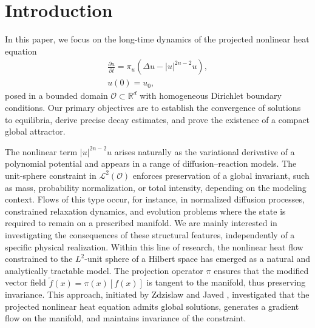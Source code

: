 \documentclass[reqno]{amsart}
\begin{document}
\section{Introduction}\label{sec-Introduction}

In this paper, we focus on the long-time dynamics of the projected nonlinear heat
equation
\begin{equation}\label{1.6}
\begin{gathered}
\frac{\partial u}{\partial t} = \pi_{u} \left( \Delta u - |u|^{2n-2} u \right), \\
u(0) = u_{0},
\end{gathered}
\end{equation}
posed in a bounded domain $\mathcal{O}\subset\mathbb{R}^{d}$ with homogeneous Dirichlet
boundary conditions. Our primary objectives are to establish the convergence of
solutions to equilibria, derive precise decay estimates, and prove the existence of
a compact global attractor.

The nonlinear term $|u|^{2n-2}u$ arises naturally as the variational derivative of
a polynomial potential and appears in a range of diffusion–reaction models.
The unit-sphere constraint in $\mathcal L^{2}(\mathcal O)$ enforces preservation of
a global invariant, such as mass, probability normalization, or total intensity,
depending on the modeling context.
Flows of this type occur, for instance, in normalized diffusion processes, constrained
relaxation dynamics, and evolution problems where the state is required to remain on
a prescribed manifold.
We are mainly interested in investigating the consequences of these structural
features, independently of a specific physical realization.
Within this line of research, the nonlinear heat flow constrained to the $L^2$-unit
sphere of a Hilbert space has emerged as a natural and analytically tractable model.
The projection operator $\pi$ ensures that the modified vector field
$\widetilde{f}(x)=\pi(x)[f(x)]$ is tangent to the manifold, thus preserving invariance.
This approach, initiated by Zdzislaw and Javed
\cite{Brz+Huss_2024,Hussain_2005,Huss_2023},
investigated that the projected nonlinear heat equation admits global solutions,
generates a gradient flow on the manifold, and maintains invariance of the constraint.
\end{document}
